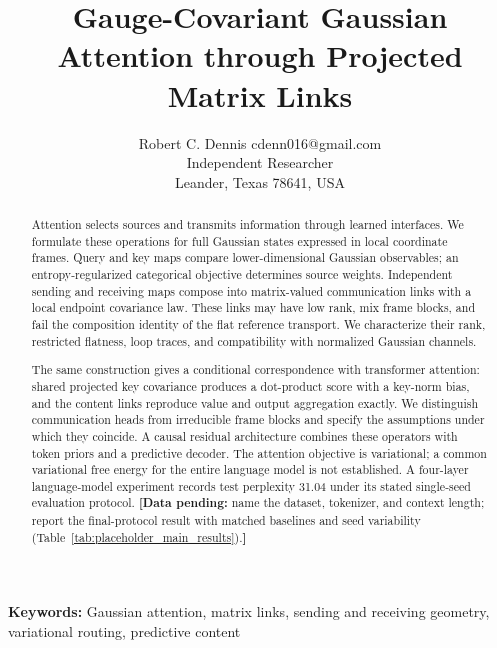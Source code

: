 \documentclass[twoside,11pt]{article}
\providecommand{\datapending}[1]{{\color{red!60!black}\textbf{[Data pending:} #1\textbf{]}}}
\begin{document}

\title{Gauge-Covariant Gaussian Attention through Projected Matrix Links}

\author{\name Robert C. Dennis \email cdenn016@gmail.com \\
  \addr Independent Researcher\\
  \addr Leander, Texas 78641, USA}


\maketitle


\begin{abstract}
Attention selects sources and transmits information through learned interfaces. We formulate these operations for full Gaussian states expressed in local coordinate frames. Query and key maps compare lower-dimensional Gaussian observables; an entropy-regularized categorical objective determines source weights. Independent sending and receiving maps compose into matrix-valued communication links with a local endpoint covariance law. These links may have low rank, mix frame blocks, and fail the composition identity of the flat reference transport. We characterize their rank, restricted flatness, loop traces, and compatibility with normalized Gaussian channels.

The same construction gives a conditional correspondence with transformer attention: shared projected key covariance produces a dot-product score with a key-norm bias, and the content links reproduce value and output aggregation exactly. We distinguish communication heads from irreducible frame blocks and specify the assumptions under which they coincide. A causal residual architecture combines these operators with token priors and a predictive decoder. The attention objective is variational; a common variational free energy for the entire language model is not established. A four-layer language-model experiment records test perplexity 31.04 under its stated single-seed evaluation protocol.
\datapending{name the dataset, tokenizer, and context length; report the final-protocol result with matched baselines and seed variability (Table~\ref{tab:placeholder_main_results}).} %

\end{abstract}
\noindent\textbf{Keywords:} Gaussian attention, matrix links, sending and receiving geometry, variational routing, predictive content
\end{document}
